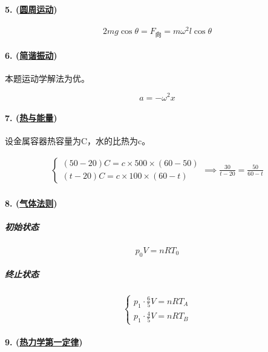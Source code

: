\paragraph{5. (\hyperref[subsec:圆周运动]{圆周运动})}

\begin{equation*}
    2mg\cos\theta=F_\textrm{向}=m\omega^2l\cos\theta
\end{equation*}

\paragraph{6. (\hyperref[subsec:简谐振动]{简谐振动})} 本题运动学解法为优。

\begin{equation*}
    a=-\omega^2x
\end{equation*}

\paragraph{7. (\hyperref[sec:热与能量]{热与能量})} 设金属容器热容量为C，水的比热为c。

\begin{gather*}
    \begin{cases}
        (50-20)C=c\times500\times(60-50)\\
        (t-20)C=c\times100\times(60-t)
    \end{cases}\implies
    \frac{30}{t-20}=\frac{50}{60-t}
\end{gather*}

\paragraph{8. (\hyperref[subsec:气体法则]{气体法则})}

\subparagraph{初始状态}

\begin{equation*}
    p_0V=nRT_0
\end{equation*}

\subparagraph{终止状态}

\begin{equation*}
    \begin{cases}
        p_1\cdot\frac65V=nRT_A\\
        p_1\cdot\frac45V=nRT_B
    \end{cases}
\end{equation*}

\paragraph{9. (\hyperref[subsec:热力学第一定律]{热力学第一定律})}

